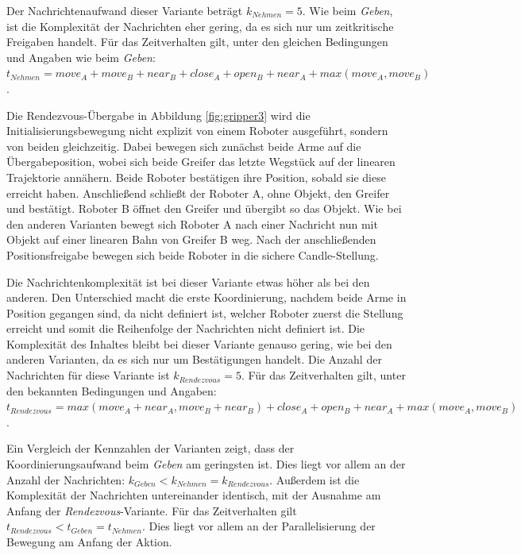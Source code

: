 Der Nachrichtenaufwand dieser Variante beträgt $k_{Nehmen} = 5$. Wie beim \textit{Geben}, ist die Komplexität der Nachrichten eher gering, da es sich nur um zeitkritische Freigaben handelt. Für das Zeitverhalten gilt, unter den gleichen Bedingungen und Angaben wie beim \textit{Geben}: $t_{Nehmen} = move_A + move_B + near_B + close_A + open_B + near_A + max(move_A, move_B)$.

Die Rendezvous-Übergabe in Abbildung \ref{fig:gripper3} wird die Initialisierungsbewegung nicht explizit von einem Roboter ausgeführt, sondern von beiden gleichzeitig. Dabei bewegen sich zunächst beide Arme auf die Übergabeposition, wobei sich beide Greifer das letzte Wegstück auf der linearen Trajektorie annähern. Beide Roboter bestätigen ihre Position, sobald sie diese erreicht haben. Anschließend schließt der Roboter A, ohne Objekt, den Greifer und bestätigt. Roboter B öffnet den Greifer und übergibt so das Objekt. Wie bei den anderen Varianten bewegt sich Roboter A nach einer Nachricht nun mit Objekt auf einer linearen Bahn von Greifer B weg. Nach der anschließenden Positionsfreigabe bewegen sich beide Roboter in die sichere Candle-Stellung.

Die Nachrichtenkomplexität ist bei dieser Variante etwas höher als bei den anderen. Den Unterschied macht die erste Koordinierung, nachdem beide Arme in Position gegangen sind, da nicht definiert ist, welcher Roboter zuerst die Stellung erreicht und somit die Reihenfolge der Nachrichten nicht definiert ist. Die Komplexität des Inhaltes bleibt bei dieser Variante genauso gering, wie bei den anderen Varianten, da es sich nur um Bestätigungen handelt. Die Anzahl der Nachrichten für diese Variante ist $k_{Rendezvous} = 5$. Für das Zeitverhalten gilt, unter den bekannten Bedingungen und Angaben:  $t_{Rendezvous} = max(move_A + near_A, move_B + near_B) + close_A + open_B + near_A + max(move_A, move_B)$.

Ein Vergleich der Kennzahlen der Varianten zeigt, dass der Koordinierungsaufwand beim \textit{Geben} am geringsten ist. Dies liegt vor allem an der Anzahl der Nachrichten: $k_{Geben} < k_{Nehmen} = k_{Rendezvous}$. Außerdem ist die Komplexität der Nachrichten untereinander identisch, mit der Ausnahme am Anfang der \textit{Rendezvous}-Variante. Für das Zeitverhalten gilt $t_{Rendezvous} < t_{Geben} = t_{Nehmen}$. Dies liegt vor allem an der Parallelisierung der Bewegung am Anfang der Aktion.

